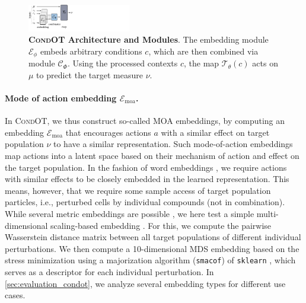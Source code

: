 \begin{figure}
    \centering
    \includegraphics[width=0.4\textwidth]{figures/fig_architecture.pdf}
    \caption{\textbf{\textsc{CondOT} Architecture and Modules}. The embedding module $\mathcal{E}_\phi$ embeds arbitrary conditions $c$, which are then combined via module $\mathcal{C}_\Phi$. Using the processed contexts $c$, the map $\mathcal{T}_\theta(c)$ acts on $\mu$ to predict the target measure $\nu$.}
    \label{fig:architecture}
\end{figure}

\paragraph{Mode of action embedding $\mathcal{E}_\text{moa}$.}
In \textsc{CondOT}, we thus construct so-called \acrfull{MOA} embeddings, by computing an embedding $\mathcal{E}_\text{moa}$ that encourages actions $a$ with a similar effect on target population $\nu$ to have a similar representation.
Such mode-of-action embeddings map actions into a latent space based on their mechanism of action and effect on the target population.
In the fashion of word embeddings \citep{mikolov2013efficient, mikolov2013distributed, mikolov2013linguistic}, we require actions with similar effects to be closely embedded in the learned representation.
This means, however, that we require some sample access of target population particles, i.e., perturbed cells by individual compounds (not in combination).
While several metric embeddings are possible \citep{chopra2005learning}, we here test a simple multi-dimensional scaling-based embedding \citep{mead1992review}.
For this, we compute the pairwise Wasserstein distance matrix between all target populations of different individual perturbations. We then compute a 10-dimensional MDS embedding based on the stress minimization using a majorization algorithm (\texttt{smacof}) \citep{de2009multidimensional} of \texttt{sklearn} \citep{pedregosa2011scikit}, which serves as a descriptor for each individual perturbation.
In \cref{sec:evaluation_condot}, we analyze several embedding types for different use cases.

